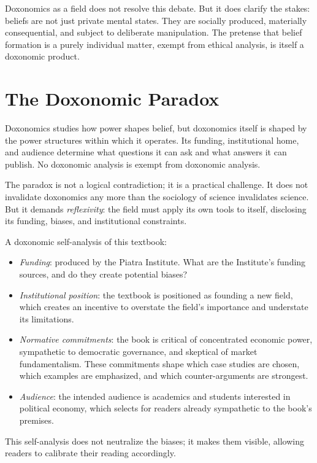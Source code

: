 Doxonomics as a field does not resolve this debate.
But it does clarify the stakes: beliefs are not just private mental states. They are socially produced, materially consequential, and subject to deliberate manipulation.
The pretense that belief formation is a purely individual matter, exempt from ethical analysis, is itself a doxonomic product.

\section{The Doxonomic Paradox}
\label{sec:ch34-paradox}

\begin{remark}
\label{rem:paradox}
Doxonomics studies how power shapes belief, but doxonomics itself is shaped by the power structures within which it operates.
Its funding, institutional home, and audience determine what questions it can ask and what answers it can publish.
No doxonomic analysis is exempt from doxonomic analysis.
\end{remark}

The paradox is not a logical contradiction; it is a practical challenge.
It does not invalidate doxonomics any more than the sociology of science invalidates science.
But it demands \emph{reflexivity}: the field must apply its own tools to itself, disclosing its funding, biases, and institutional constraints.

\begin{example}
\label{ex:self-analysis}
A doxonomic self-analysis of this textbook:
\begin{itemize}[nosep]
  \item \emph{Funding}: produced by the Piatra Institute. What are the Institute's funding sources, and do they create potential biases?
  \item \emph{Institutional position}: the textbook is positioned as founding a new field, which creates an incentive to overstate the field's importance and understate its limitations.
  \item \emph{Normative commitments}: the book is critical of concentrated economic power, sympathetic to democratic governance, and skeptical of market fundamentalism. These commitments shape which case studies are chosen, which examples are emphasized, and which counter-arguments are strongest.
  \item \emph{Audience}: the intended audience is academics and students interested in political economy, which selects for readers already sympathetic to the book's premises.
\end{itemize}
This self-analysis does not neutralize the biases; it makes them visible, allowing readers to calibrate their reading accordingly.
\end{example}

